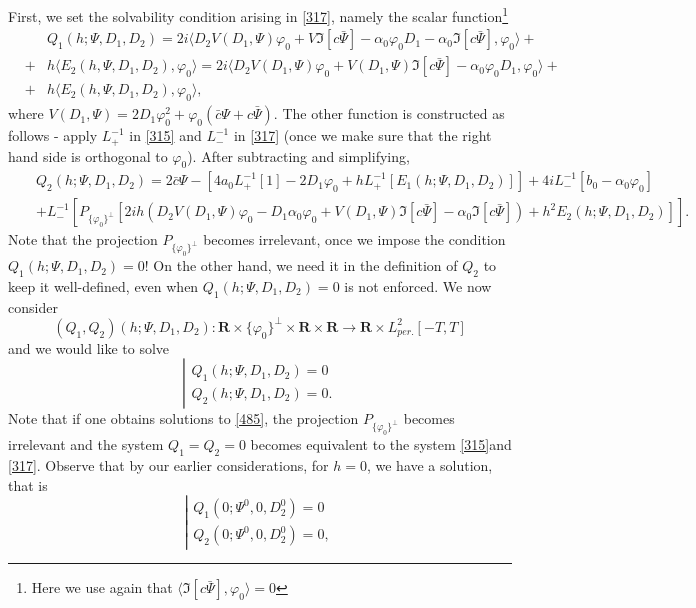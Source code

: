 \documentclass[12pt]{amsart}
\theoremstyle{definition}
\theoremstyle{remark}
\numberwithin{equation}{section}
\renewcommand{\(}{\left(}
\renewcommand{\)}{\right)}
\renewcommand{\[}{\left[}
\renewcommand{\]}{\right]}
\newcommand{\al}{\alpha}
\newcommand{\vp}{\varphi}
\newcommand{\rone}{\mathbf R}
\newcommand{\dpr}[2]{\langle #1,#2 \rangle}
\begin{document}
 First, we set the solvability condition arising in \eqref{317}, namely the scalar function\footnote{Here we use again that $\dpr{ \Im[c\bar{\Psi}]}{\vp_0}=0$}
 \begin{eqnarray*}
& & Q_1(h; \Psi, D_1, D_2) = 2i\dpr{D_2  V(D_1, \Psi)\vp_0 +V \Im[c\bar{\Psi}] - \al_0 \vp_0 D_1 -\al_0 \Im[c\bar{\Psi}]}{\vp_0}+ \\
&+& h \dpr{E_2(h,\Psi, D_1, D_2)}{\vp_0}  = 2i\dpr{D_2  V(D_1, \Psi)\vp_0 + V(D_1, \Psi) \Im[c\bar{\Psi}]  - \al_0 \vp_0D_1 }{\vp_0}+\\
&+& h \dpr{E_2(h,\Psi, D_1, D_2)}{\vp_0},
 \end{eqnarray*}
 where $V(D_1, \Psi)=2 D_1 \vp_0^2 + \vp_0(\bar{c} \Psi+c \bar{\Psi})$. The other function is constructed as follows - apply $L_+^{-1}$ in \eqref{315} and $L_-^{-1}$ in \eqref{317} (once we make  sure that the right hand side is orthogonal to $\vp_0$).  After subtracting and simplifying,
 \begin{eqnarray*}
& & Q_2(h; \Psi, D_1, D_2) =  2 \bar{c} \Psi -\left[ 4 a_0 L_+^{-1}[1] - 2  D_1 \vp_0    +h L_+^{-1}[E_1(h; \Psi, D_1,D_2)]  \right]
+4i L_-^{-1}[b_0 -  \al_0 \vp_0] \\
& & + L_-^{-1}[P_{\{\vp_0\}^\perp}[2 i h(D_2 V(D_1, \Psi) \vp_0 -D_1 \al_0\vp_0+V(D_1, \Psi) \Im[c\bar{\Psi}]-\al_0 \Im[c\bar{\Psi}])+h^2 E_2(h; \Psi, D_1,D_2) ]].
 \end{eqnarray*}
 Note that the projection $P_{\{\vp_0\}^\perp}$ becomes irrelevant, once we impose the condition \\
 $Q_1(h; \Psi, D_1, D_2)=0$! On the other hand, we need it in the definition of $Q_2$ to keep it well-defined, even when $Q_1(h; \Psi, D_1, D_2)=0$ is not enforced. We now consider
 $$
 (Q_1, Q_2)(h; \Psi, D_1, D_2): \rone\times \{\vp_0\}^\perp \times \rone\times \rone \to \rone\times L^2_{per.}[-T,T]
 $$
 and we would like to solve
\begin{equation}
\label{485}
 \left|
 \begin{array}{c}
 Q_1(h; \Psi, D_1, D_2)=0 \\
 Q_2(h; \Psi, D_1, D_2)=0.
 \end{array}
 \right.
\end{equation}
 Note that if one obtains solutions to \eqref{485}, the projection $P_{\{\vp_0\}^\perp}$ becomes irrelevant and the system  $Q_1=Q_2=0$ becomes equivalent to the system \eqref{315}and \eqref{317}.
 Observe that by our earlier considerations, for $h=0$, we have a solution, that is
 $$
 \left|
 \begin{array}{c}
 Q_1(0; \Psi^0, 0, D_2^0)=0 \\
 Q_2(0; \Psi^0, 0, D_2^0)=0,
 \end{array}
 \right.
 $$
\end{document}
